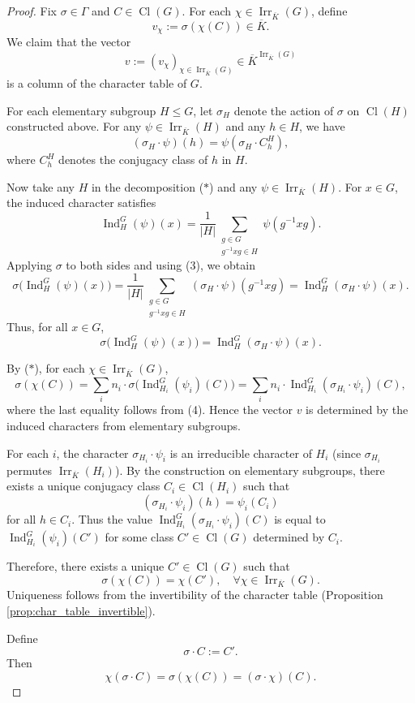 \begin{proof}
Fix \(\sigma \in \Gamma\) and \(C \in \operatorname{Cl}(G)\). For each \(\chi \in \operatorname{Irr}_{\overline K}(G)\), define
\[
v_\chi := \sigma(\chi(C)) \in \overline K.
\]
We claim that the vector
\[
v := (v_\chi)_{\chi \in \operatorname{Irr}_{\overline K}(G)} \in \overline K^{\operatorname{Irr}_{\overline K}(G)}
\]
is a column of the character table of \(G\).

For each elementary subgroup \(H \le G\), let \(\sigma_H\) denote the action of \(\sigma\) on \(\operatorname{Cl}(H)\) constructed above. For any \(\psi \in \operatorname{Irr}_{\overline K}(H)\) and any \(h \in H\), we have
\[
(\sigma_H \cdot \psi)(h) = \psi(\sigma_H \cdot C_h^H),
\]
where \(C_h^H\) denotes the conjugacy class of \(h\) in \(H\).

Now take any \(H\) in the decomposition ($*$) and any \(\psi \in \operatorname{Irr}_{\overline K}(H)\). For \(x \in G\), the induced character satisfies
\[
\operatorname{Ind}_H^G(\psi)(x) = \frac{1}{|H|} \sum_{\substack{g \in G \\ g^{-1}xg \in H}} \psi(g^{-1}xg).
\]
Applying \(\sigma\) to both sides and using (3), we obtain
\[
\sigma\bigl(\operatorname{Ind}_H^G(\psi)(x)\bigr)
= \frac{1}{|H|} \sum_{\substack{g \in G \\ g^{-1}xg \in H}} (\sigma_H \cdot \psi)(g^{-1}xg)
= \operatorname{Ind}_H^G(\sigma_H \cdot \psi)(x).
\]
Thus, for all \(x \in G\),
\[
\sigma\bigl(\operatorname{Ind}_H^G(\psi)(x)\bigr)
= \operatorname{Ind}_H^G(\sigma_H \cdot \psi)(x). 
\]

By ($*$), for each \(\chi \in \operatorname{Irr}_{\overline K}(G)\),
\[
\sigma(\chi(C)) = \sum_i n_i \cdot \sigma\bigl(\operatorname{Ind}_{H_i}^G(\psi_i)(C)\bigr)
= \sum_i n_i \cdot \operatorname{Ind}_{H_i}^G(\sigma_{H_i} \cdot \psi_i)(C),
\]
where the last equality follows from (4). Hence the vector \(v\) is determined by the induced characters from elementary subgroups.

For each \(i\), the character \(\sigma_{H_i} \cdot \psi_i\) is an irreducible character of \(H_i\) (since \(\sigma_{H_i}\) permutes \(\operatorname{Irr}_{\overline K}(H_i)\)). By the construction on elementary subgroups, there exists a unique conjugacy class \(C_i \in \operatorname{Cl}(H_i)\) such that
\[
(\sigma_{H_i} \cdot \psi_i)(h) = \psi_i(C_i)
\]
for all \(h \in C_i\). Thus the value \(\operatorname{Ind}_{H_i}^G(\sigma_{H_i} \cdot \psi_i)(C)\) is equal to \(\operatorname{Ind}_{H_i}^G(\psi_i)(C')\) for some class \(C' \in \operatorname{Cl}(G)\) determined by \(C_i\).

Therefore, there exists a unique \(C' \in \operatorname{Cl}(G)\) such that
\[
\sigma(\chi(C)) = \chi(C') ,\quad \forall \chi \in \operatorname{Irr}_{\overline K}(G).
\]
Uniqueness follows from the invertibility of the character table (Proposition \ref{prop:char_table_invertible}).

Define
\[
\sigma \cdot C := C'.
\]
Then 
\[
\chi(\sigma \cdot C) = \sigma(\chi(C)) = (\sigma \cdot \chi)(C).
\]
\end{proof}

